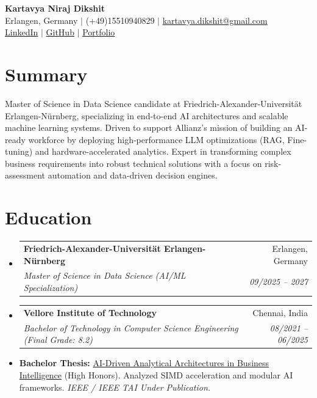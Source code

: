 \documentclass[10pt,a4paper]{article}
\makeatletter
\newcommand{\resumeItem}[1]{\item\small{#1}}
\newcommand{\resumeSubheading}[4]{
  \vspace{-1pt}\item
    \begin{tabular*}{1.0\textwidth}[t]{l@{\extracolsep{\fill}}r}
      \textbf{#1} & #2 \\
      \textit{\small#3} & \textit{\small #4} \\
    \end{tabular*}\vspace{-5pt}
}
\makeatother
\begin{document}
\begin{center}
    \textbf{\huge Kartavya Niraj Dikshit} \\ \vspace{4pt}
    \small Erlangen, Germany $|$ (+49)15510940829 $|$ \href{mailto:kartavya.dikshit@gmail.com}{kartavya.dikshit@gmail.com} \\
    \small \href{https://www.linkedin.com/in/kartavya-dikshit}{LinkedIn} $|$ \href{https://github.com/KartavyaDikshit}{GitHub} $|$ \href{https://kartavyadikshit.github.io/}{Portfolio}
\end{center}

\section{Summary}
Master of Science in Data Science candidate at Friedrich-Alexander-Universität Erlangen-Nürnberg, specializing in end-to-end AI architectures and scalable machine learning systems. Driven to support Allianz's mission of building an AI-ready workforce by deploying high-performance LLM optimizations (RAG, Fine-tuning) and hardware-accelerated analytics. Expert in transforming complex business requirements into robust technical solutions with a focus on risk-assessment automation and data-driven decision engines.

\section{Education}
\begin{itemize}[label={}]
    \resumeSubheading
      {Friedrich-Alexander-Universität Erlangen-Nürnberg}{Erlangen, Germany}
      {Master of Science in Data Science (AI/ML Specialization)}{09/2025 -- 2027}
    \resumeSubheading
      {Vellore Institute of Technology}{Chennai, India}
      {Bachelor of Technology in Computer Science Engineering (Final Grade: 8.2)}{08/2021 -- 06/2025}
      \resumeItem{\textbf{Bachelor Thesis:} \href{http://datums.ai/}{AI-Driven Analytical Architectures in Business Intelligence} (High Honors). Analyzed SIMD acceleration and modular AI frameworks. \emph{IEEE / IEEE TAI Under Publication.}}
\end{itemize}
\end{document}
